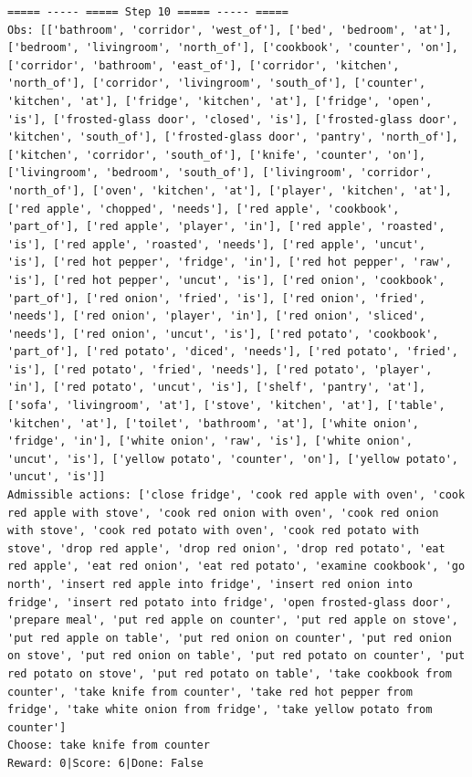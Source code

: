 \documentclass[11pt]{article}
\begin{document}
\begin{lstlisting}
===== ----- ===== Step 10 ===== ----- =====
Obs: [['bathroom', 'corridor', 'west_of'], ['bed', 'bedroom', 'at'], ['bedroom', 'livingroom', 'north_of'], ['cookbook', 'counter', 'on'], ['corridor', 'bathroom', 'east_of'], ['corridor', 'kitchen', 'north_of'], ['corridor', 'livingroom', 'south_of'], ['counter', 'kitchen', 'at'], ['fridge', 'kitchen', 'at'], ['fridge', 'open', 'is'], ['frosted-glass door', 'closed', 'is'], ['frosted-glass door', 'kitchen', 'south_of'], ['frosted-glass door', 'pantry', 'north_of'], ['kitchen', 'corridor', 'south_of'], ['knife', 'counter', 'on'], ['livingroom', 'bedroom', 'south_of'], ['livingroom', 'corridor', 'north_of'], ['oven', 'kitchen', 'at'], ['player', 'kitchen', 'at'], ['red apple', 'chopped', 'needs'], ['red apple', 'cookbook', 'part_of'], ['red apple', 'player', 'in'], ['red apple', 'roasted', 'is'], ['red apple', 'roasted', 'needs'], ['red apple', 'uncut', 'is'], ['red hot pepper', 'fridge', 'in'], ['red hot pepper', 'raw', 'is'], ['red hot pepper', 'uncut', 'is'], ['red onion', 'cookbook', 'part_of'], ['red onion', 'fried', 'is'], ['red onion', 'fried', 'needs'], ['red onion', 'player', 'in'], ['red onion', 'sliced', 'needs'], ['red onion', 'uncut', 'is'], ['red potato', 'cookbook', 'part_of'], ['red potato', 'diced', 'needs'], ['red potato', 'fried', 'is'], ['red potato', 'fried', 'needs'], ['red potato', 'player', 'in'], ['red potato', 'uncut', 'is'], ['shelf', 'pantry', 'at'], ['sofa', 'livingroom', 'at'], ['stove', 'kitchen', 'at'], ['table', 'kitchen', 'at'], ['toilet', 'bathroom', 'at'], ['white onion', 'fridge', 'in'], ['white onion', 'raw', 'is'], ['white onion', 'uncut', 'is'], ['yellow potato', 'counter', 'on'], ['yellow potato', 'uncut', 'is']]
Admissible actions: ['close fridge', 'cook red apple with oven', 'cook red apple with stove', 'cook red onion with oven', 'cook red onion with stove', 'cook red potato with oven', 'cook red potato with stove', 'drop red apple', 'drop red onion', 'drop red potato', 'eat red apple', 'eat red onion', 'eat red potato', 'examine cookbook', 'go north', 'insert red apple into fridge', 'insert red onion into fridge', 'insert red potato into fridge', 'open frosted-glass door', 'prepare meal', 'put red apple on counter', 'put red apple on stove', 'put red apple on table', 'put red onion on counter', 'put red onion on stove', 'put red onion on table', 'put red potato on counter', 'put red potato on stove', 'put red potato on table', 'take cookbook from counter', 'take knife from counter', 'take red hot pepper from fridge', 'take white onion from fridge', 'take yellow potato from counter']
Choose: take knife from counter
Reward: 0|Score: 6|Done: False


\end{lstlisting}
\end{document}
